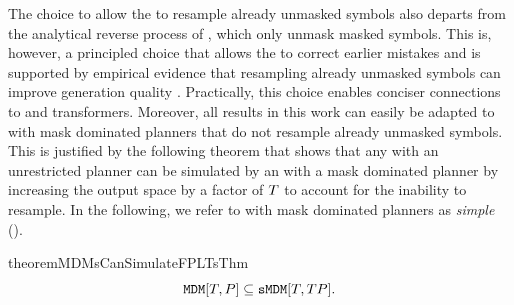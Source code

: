 The choice to allow the \MDMAcr to resample already unmasked symbols also departs from the analytical reverse process of \MDMsAcr, which only unmask masked symbols.
This is, however, a principled choice that allows the \MDMAcr to correct earlier mistakes and is supported by empirical evidence that resampling already unmasked symbols can improve generation quality \citep{rutte2025generalized}.
Practically, this choice enables conciser connections to \LTsAcr and \pCoTAcr transformers.
Moreover, all results in this work can easily be adapted to \MDMsAcr with mask dominated planners that do not resample already unmasked symbols.
This is justified by the following theorem that shows that any \MDMAcr with an unrestricted planner can be simulated by an \MDMAcr with a mask dominated planner by increasing the output space by a factor of ${T}$ to account for the inability to resample.
In the following, we refer to \MDMsAcr with mask dominated planners as \emph{simple} \MDMsAcr (\sMDMsAcr).
\begin{restatable}{theorem}{MDMsCanSimulateFPLTsThm} \label{thm:mdms-can-simulate-emdms}
   \begin{equation}
      {\mathtt{MDM}}[{T}, {P}] \subseteq {\mathtt{sMDM}}[{T}, {T} {P}].
   \end{equation}
\end{restatable}
